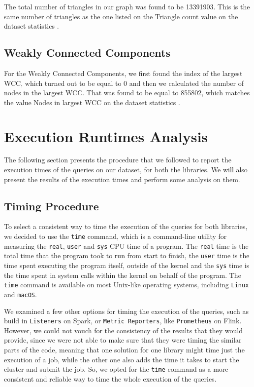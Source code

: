 \documentclass[conference]{IEEEtran}
\begin{document}
The total number of triangles in our graph was found to be 13391903. This is the same number of triangles as the one listed on the Triangle count value on the dataset statistics \cite{b5} \cite{b6}.

\subsection{Weakly Connected Components}

For the Weakly Connected Components, we first found the index of the largest WCC, which turned out to be equal to 0 and then we calculated the number of nodes in the largest WCC. That was found to be equal to 855802, which matches the value Nodes in largest WCC on the dataset statistics \cite{b5}.

\section{\textbf{Execution Runtimes Analysis}}\label{times}

The following section presents the procedure that we followed to report the execution times of the queries on our dataset, for both the libraries. We will also present the results of the execution times and perform some analysis on them.

\subsection{Timing Procedure}

To select a consistent way to time the execution of the queries for both libraries, we decided to use the \verb|time| command, which is a command-line utility for measuring the \verb|real|, \verb|user| and \verb|sys| CPU time of a program. The \verb|real| time is the total time that the program took to run from start to finish, the \verb|user| time is the time spent executing the program itself, outside of the kernel and the \verb|sys| time is the time spent in system calls within the kernel on behalf of the program. The \verb|time| command is available on most Unix-like operating systems, including \verb|Linux| and \verb|macOS|.

We examined a few other options for timing the execution of the queries, such as build in \verb|Listeners| on Spark, or \verb|Metric Reporters|, like \verb|Prometheus| on Flink. However, we could not vouch for the consistency of the results that they would provide, since we were not able to make sure that they were timing the similar parts of the code, meaning that one solution for one library might time just the execution of a job, while the other one also adds the time it takes to start the cluster and submit the job. So, we opted for the \verb|time| command as a more consistent and reliable way to time the whole execution of the queries.
\end{document}
